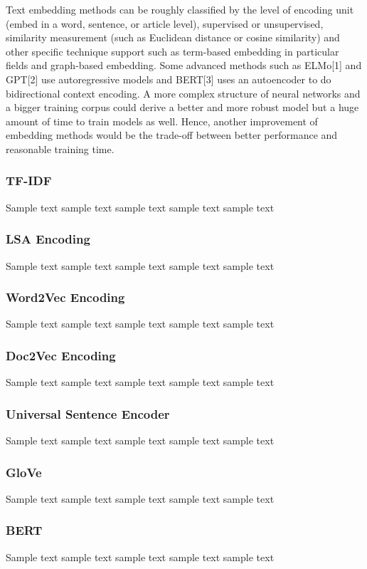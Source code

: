 Text embedding methods can be roughly classified by the level of encoding unit (embed in a word, sentence, or article level), supervised or unsupervised, similarity measurement (such as Euclidean distance or cosine similarity) and other specific technique support such as term-based embedding in particular fields and graph-based embedding.
Some advanced methods such as ELMo[1] and GPT[2] use autoregressive models and BERT[3] uses an autoencoder to do bidirectional context encoding.
A more complex structure of neural networks and a bigger training corpus could derive a better and more robust model but a huge amount of time to train models as well.
Hence, another improvement of embedding methods would be the trade-off between better performance and reasonable training time.

\subsubsection{TF-IDF}
Sample text sample text sample text sample text sample text

\subsubsection{LSA Encoding}
Sample text sample text sample text sample text sample text

\subsubsection{Word2Vec Encoding}
Sample text sample text sample text sample text sample text

\subsubsection{Doc2Vec Encoding}
Sample text sample text sample text sample text sample text

\subsubsection{Universal Sentence Encoder}
Sample text sample text sample text sample text sample text

\subsubsection{GloVe}
Sample text sample text sample text sample text sample text

\subsubsection{BERT}
Sample text sample text sample text sample text sample text

